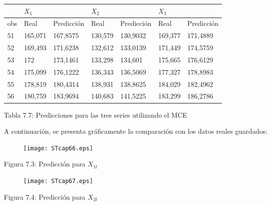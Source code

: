 \begin{table}[H]
\begin{center}
\begin{tabular}{|p{60pt}|p{60pt}|p{60pt}|p{60pt}|p{60pt}|p{60pt}|p{60pt}|}
\hline
& 
\multicolumn{2}{|p{120pt}|}{$X_{1}$} & 
\multicolumn{2}{|p{120pt}|}{$X_{2}$} & 
\multicolumn{2}{|p{120pt}|}{$X_{3}$} \\
\hline
obs& 
Real& 
Predicci\'{o}n& 
Real& 
Predicci\'{o}n& 
Real& 
Predicci\'{o}n \\
\hline
51& 
165,071& 
167,8575& 
130,579& 
130,9032& 
169,377& 
171,4889 \\
\hline
52& 
169,493& 
171,6238& 
132,612& 
133,0139& 
171,449& 
174,5759 \\
\hline
53& 
172& 
173,1461& 
133,298& 
134,601& 
175,665& 
176,6129 \\
\hline
54& 
175,099& 
176,1222& 
136,343& 
136,5069& 
177,327& 
178,8983 \\
\hline
55& 
178,819& 
180,4314& 
138,931& 
138,8625& 
184,029& 
182,4962 \\
\hline
56& 
180,759& 
183,9694& 
140,683& 
141,5225& 
183,299& 
186,2786 \\
\hline
\end{tabular}
\label{tab15}
\end{center}
\end{table}

\begin{center}
Tabla 7.7: Predicciones para las tres series utilizando el MCE
\end{center}

A continuaci\'{o}n, se presenta gr\'{a}ficamente la comparaci\'{o}n con los 
datos reales guardados:

\begin{figure}[H]
\texttt{[image: STcap66.eps]}
\label{fig6}
\end{figure}

\begin{center}
Figura 7.3: Predicci\'{o}n para $X_{1t}$
\end{center}

\begin{figure}[H]
\texttt{[image: STcap67.eps]}
\label{fig7}
\end{figure}

\begin{center}
Figura 7.4: Predicci\'{o}n para $X_{2t}$
\end{center}


